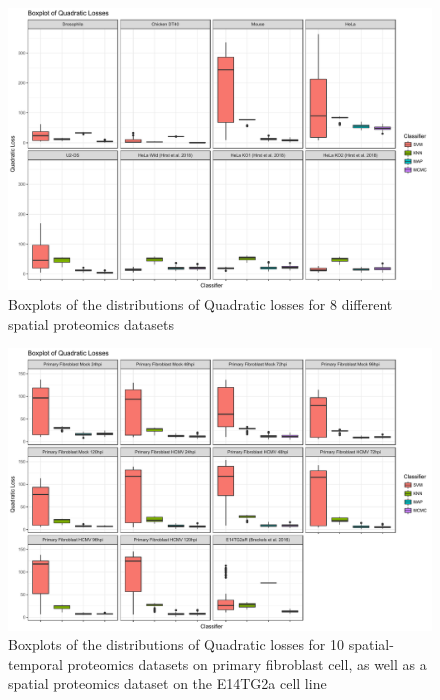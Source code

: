 \documentclass[12pt,english]{article}\usepackage[]{graphicx}\usepackage[]{color}
\begin{document}
\begin{figure}[ht]
  \centering
\includegraphics[width=\textwidth]{Quadlosscompare1.pdf}
  \caption{Boxplots of the distributions of Quadratic losses
    for 8 different spatial proteomics datasets}
  \label{figure::quadloss1}
\end{figure}

\begin{figure}[ht]
  \centering
\includegraphics[width=\textwidth]{Quadlosscompare2.pdf}
  \caption{Boxplots of the distributions of Quadratic losses
    for 10 spatial-temporal proteomics datasets on primary fibroblast cell,
    as well as a spatial proteomics dataset on the E14TG2a cell line}
  \label{figure::quadloss2}
\end{figure}


\clearpage
\end{document}

